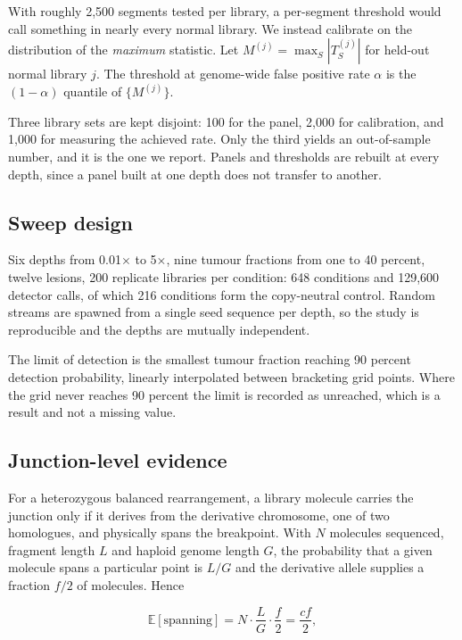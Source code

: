 \documentclass[conference]{IEEEtran}
\begin{document}
With roughly 2{,}500 segments tested per library, a per-segment threshold would
call something in nearly every normal library. We instead calibrate on the
distribution of the \emph{maximum} statistic. Let $M^{(j)} = \max_S |T_S^{(j)}|$
for held-out normal library $j$. The threshold at genome-wide false positive
rate $\alpha$ is the $(1-\alpha)$ quantile of $\{M^{(j)}\}$.

Three library sets are kept disjoint: 100 for the panel, 2{,}000 for
calibration, and 1{,}000 for measuring the achieved rate. Only the third yields an
out-of-sample number, and it is the one we report. Panels and thresholds are
rebuilt at every depth, since a panel built at one depth does not transfer to
another.

\subsection{Sweep design}

Six depths from 0.01$\times$ to 5$\times$, nine tumour fractions from one to 40
percent, twelve lesions, 200 replicate libraries per condition: 648 conditions
and 129{,}600 detector calls, of which 216 conditions form the copy-neutral
control. Random streams are spawned from a single seed
sequence per depth, so the study is reproducible and the depths are mutually
independent.

The limit of detection is the smallest tumour fraction reaching 90 percent
detection probability, linearly interpolated between bracketing grid points.
Where the grid never reaches 90 percent the limit is recorded as unreached,
which is a result and not a missing value.

\subsection{Junction-level evidence}

For a heterozygous balanced rearrangement, a library molecule carries the
junction only if it derives from the derivative chromosome, one of two
homologues, and physically spans the breakpoint. With $N$ molecules sequenced,
fragment length $L$ and haploid genome length $G$, the probability that a given
molecule spans a particular point is $L/G$ and the derivative allele supplies a
fraction $f/2$ of molecules. Hence

\begin{equation}
\mathbb{E}[\text{spanning}] = N \cdot \frac{L}{G} \cdot \frac{f}{2}
= \frac{c f}{2},
\label{eq:junction}
\end{equation}
\end{document}
